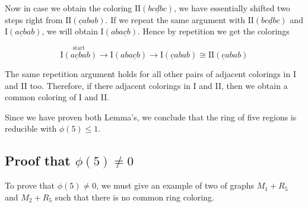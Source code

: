 Now in case we obtain the coloring $\text{II}(bc\underline{d}bc)$, we have essentially shifted two steps right from $\text{II}(\underline{c}abab)$. If we repeat the same argument with $\text{II}(bc\underline{d}bc)$ and $\text{I}(a\underline{c}bab)$, we will obtain $\text{I}(aba\underline{c}b)$. Hence by repetition we get the colorings

\begin{equation*}
    \stackrel{\text{start}}{\text{I}(a\underline{c}bab)} \rightarrow 
    \text{I}(aba\underline{c}b) \rightarrow 
    \text{I}(\underline{c}abab) \cong \text{II}(\underline{c}abab)
\end{equation*}

The same repetition argument holds for all other pairs of adjacent colorings in I and II too. Therefore, if there adjacent colorings in I and II, then we obtain a common coloring of I and II.

Since we have proven both Lemma's, we conclude that the ring of five regions is reducible with $\phi(5) \leq 1$.

\subsection{Proof that $\phi(5) \neq 0$}

To prove that $\phi(5) \neq 0$, we must give an example of two  of graphs $M_1+R_5$ and $M_2+R_5$ such that there is no common ring coloring.

